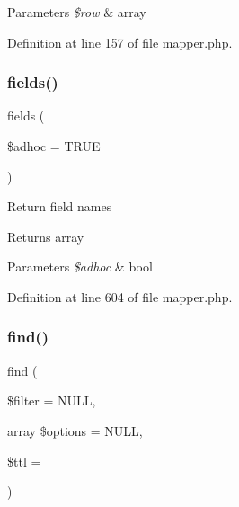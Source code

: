 \begin{DoxyParams}{Parameters}
{\em \$row} & array \\
\hline
\end{DoxyParams}


Definition at line 157 of file mapper.\+php.

\hypertarget{class_d_b_1_1_s_q_l_1_1_mapper_a10174b3b4ef6bf0883a0246fa3ac2f8d}{}\label{class_d_b_1_1_s_q_l_1_1_mapper_a10174b3b4ef6bf0883a0246fa3ac2f8d} 
\subsubsection{\texorpdfstring{fields()}{fields()}}
{\footnotesize\ttfamily fields (\begin{DoxyParamCaption}\item[{}]{\$adhoc = {\ttfamily TRUE} }\end{DoxyParamCaption})}

Return field names \begin{DoxyReturn}{Returns}
array 
\end{DoxyReturn}

\begin{DoxyParams}{Parameters}
{\em \$adhoc} & bool \\
\hline
\end{DoxyParams}


Definition at line 604 of file mapper.\+php.

\hypertarget{class_d_b_1_1_s_q_l_1_1_mapper_a45e70f55799839fc0286bc94000924a7}{}\label{class_d_b_1_1_s_q_l_1_1_mapper_a45e70f55799839fc0286bc94000924a7} 
\subsubsection{\texorpdfstring{find()}{find()}}
{\footnotesize\ttfamily find (\begin{DoxyParamCaption}\item[{}]{\$filter = {\ttfamily NULL},  }\item[{array}]{\$options = {\ttfamily NULL},  }\item[{}]{\$ttl = {} }\end{DoxyParamCaption})}

